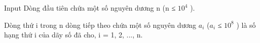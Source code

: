 Input
Dòng đầu tiên chứa một số nguyên dương n (n ≤ $10^{4}$ ).

Dòng thứ i trong n dòng tiếp theo chứa một số nguyên dương $a_{i}$ ($a_{i}$ ≤ $10^{8}$ ) là số hạng thứ i của dãy số đã cho, i = 1, 2, ..., n.